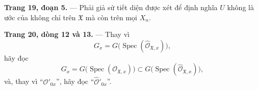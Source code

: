 \noindent\textbf{Trang 19, đoạn 5.} --- Phải giả sử tiết diện được xét để định
nghĩa $U$ không là ước của không chỉ trên $\mathfrak X$ mà còn trên mọi $X_n$.

\noindent\textbf{Trang 20, dòng 12 và 13.} --- Thay vì
\[
  G_x=G\bigl(\operatorname{Spec}(\widehat{\mathcal O}_{\mathfrak X,x})\bigr),
\]
hãy đọc
\[
  G_x=G\bigl(\operatorname{Spec}(\mathcal O_{\mathfrak X,x})\bigr)
  \subset
  G\bigl(\operatorname{Spec}(\widehat{\mathcal O}_{\mathfrak X,x})\bigr),
\]
và, thay vì ``$\mathcal O'_{0x}$'', hãy đọc
``$\widehat{\mathcal O}'_{0x}$''.

\par
